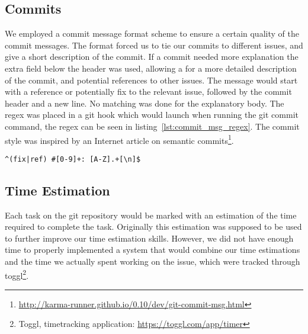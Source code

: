 \subsection{Commits}
We employed a commit message format scheme to ensure a certain quality of the commit messages.
The format forced us to tie our commits to different issues, and give a short description of the commit.
If a commit needed more explanation the extra field below the header was used,
allowing a for a more detailed description of the commit, and potential references to other issues.
The message would start with a reference or potentially fix to the relevant issue,
followed by the commit header and a new line.
No matching was done for the explanatory body.
The regex was placed in a git hook which would launch when running the git commit command, the regex can be seen in listing~\ref{lst:commit_msg_regex}.
The commit style was inspired by an Internet article on semantic commits\footnote{\url{http://karma-runner.github.io/0.10/dev/git-commit-msg.html}}.

\begin{lstlisting}[xleftmargin=18.0ex, caption=Commit message regex, captionpos=b, label=lst:commit_msg_regex]
^(fix|ref) #[0-9]+: [A-Z].+[\n]$
\end{lstlisting}

\subsection{Time Estimation}
Each task on the git repository would be marked with an estimation of the time required to complete the task.
Originally this estimation was supposed to be used to further improve our time estimation skills.
However, we did not have enough time to properly implemented a system that would combine our time estimations
and the time we actually spent working on the issue, which were tracked through toggl\footnote{Toggl, timetracking application: \url{https://toggl.com/app/timer}}.
